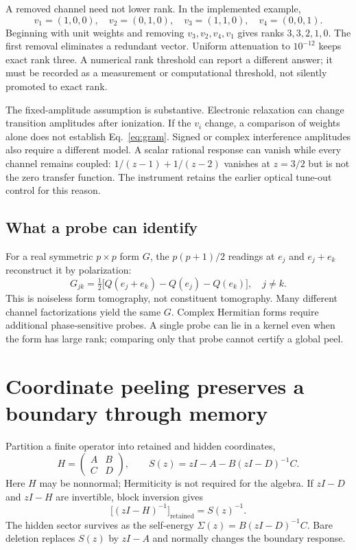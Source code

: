 \documentclass[11pt]{article}
\begin{document}
A removed channel need not lower rank. In the implemented example,
\begin{equation}
v_1=(1,0,0),\quad v_2=(0,1,0),\quad v_3=(1,1,0),\quad v_4=(0,0,1).
\end{equation}
Beginning with unit weights and removing $v_3,v_2,v_4,v_1$ gives ranks $3,3,2,1,0$. The first removal eliminates a redundant vector. Uniform attenuation to $10^{-12}$ keeps exact rank three. A numerical rank threshold can report a different answer; it must be recorded as a measurement or computational threshold, not silently promoted to exact rank.

The fixed-amplitude assumption is substantive. Electronic relaxation can change transition amplitudes after ionization. If the $v_i$ change, a comparison of weights alone does not establish Eq.~\eqref{eq:gram}. Signed or complex interference amplitudes also require a different model. A scalar rational response can vanish while every channel remains coupled: $1/(z-1)+1/(z-2)$ vanishes at $z=3/2$ but is not the zero transfer function. The instrument retains the earlier optical tune-out control for this reason.

\subsection{What a probe can identify}
For a real symmetric $p\times p$ form $G$, the $p(p+1)/2$ readings at $e_j$ and $e_j+e_k$ reconstruct it by polarization:
\begin{equation}
G_{jk}=\tfrac12\bigl[Q(e_j+e_k)-Q(e_j)-Q(e_k)\bigr],\quad j\ne k.
\end{equation}
This is noiseless form tomography, not constituent tomography. Many different channel factorizations yield the same $G$. Complex Hermitian forms require additional phase-sensitive probes. A single probe can lie in a kernel even when the form has large rank; comparing only that probe cannot certify a global peel.

\section{Coordinate peeling preserves a boundary through memory}
Partition a finite operator into retained and hidden coordinates,
\begin{equation}
H=\begin{pmatrix}A&B\\ C&D\end{pmatrix},\qquad
S(z)=zI-A-B(zI-D)^{-1}C.
\label{eq:schur}
\end{equation}
Here $H$ may be nonnormal; Hermiticity is not required for the algebra. If $zI-D$ and $zI-H$ are invertible, block inversion gives
\begin{equation}
\bigl[(zI-H)^{-1}\bigr]_{\mathrm{retained}}=S(z)^{-1}.
\label{eq:resolvent}
\end{equation}
The hidden sector survives as the self-energy $\Sigma(z)=B(zI-D)^{-1}C$. Bare deletion replaces $S(z)$ by $zI-A$ and normally changes the boundary response.
\end{document}
